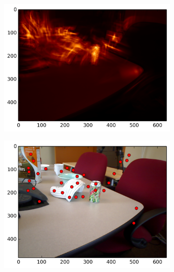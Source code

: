 \begin{figure}[ht]
\begin{subfigure}[]{0.25\linewidth}\label{fig:meet_smag_2}\includegraphics[width=\linewidth]{figures/meeting_smag_5}\end{subfigure}%
\begin{subfigure}[]{0.25\linewidth}\label{fig:meet_feats_2}\includegraphics[width=\linewidth]{figures/meeting_feats_5}\end{subfigure}\\

\end{figure}
